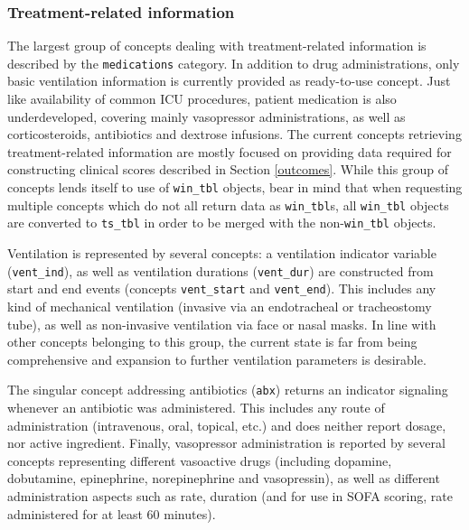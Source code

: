 \documentclass[
  notitle]{jss}
\begin{document}
\hypertarget{treatment-related-information}{%
\subsubsection{Treatment-related
information}\label{treatment-related-information}}

The largest group of concepts dealing with treatment-related information
is described by the \texttt{medications} category. In addition to drug
administrations, only basic ventilation information is currently
provided as ready-to-use concept. Just like availability of common ICU
procedures, patient medication is also underdeveloped, covering mainly
vasopressor administrations, as well as corticosteroids, antibiotics and
dextrose infusions. The current concepts retrieving treatment-related
information are mostly focused on providing data required for
constructing clinical scores described in Section \ref{outcomes}. While
this group of concepts lends itself to use of \texttt{win\_tbl} objects,
bear in mind that when requesting multiple concepts which do not all
return data as \texttt{win\_tbl}s, all \texttt{win\_tbl} objects are
converted to \texttt{ts\_tbl} in order to be merged with the
non-\texttt{win\_tbl} objects.

Ventilation is represented by several concepts: a ventilation indicator
variable (\texttt{vent\_ind}), as well as ventilation durations
(\texttt{vent\_dur}) are constructed from start and end events (concepts
\texttt{vent\_start} and \texttt{vent\_end}). This includes any kind of
mechanical ventilation (invasive via an endotracheal or tracheostomy
tube), as well as non-invasive ventilation via face or nasal masks. In
line with other concepts belonging to this group, the current state is
far from being comprehensive and expansion to further ventilation
parameters is desirable.

The singular concept addressing antibiotics (\texttt{abx}) returns an
indicator signaling whenever an antibiotic was administered. This
includes any route of administration (intravenous, oral, topical, etc.)
and does neither report dosage, nor active ingredient. Finally,
vasopressor administration is reported by several concepts representing
different vasoactive drugs (including dopamine, dobutamine, epinephrine,
norepinephrine and vasopressin), as well as different administration
aspects such as rate, duration (and for use in SOFA scoring, rate
administered for at least 60 minutes).
\end{document}
